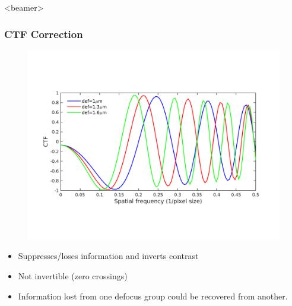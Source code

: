 \documentclass{beamer}
\begin{document}
\begin{frame}<beamer>
\frametitle{CTF Correction}
\vspace{-3mm}
\begin{figure}[]
\includegraphics[scale=0.45]{figures/ctfeg_fig.png}
\end{figure}
\vspace{-12mm}
\begin{itemize}[]
\item Suppresses/loses information and inverts contrast
\item Not invertible (zero crossings)
\item Information lost from one defocus group could be recovered from another.
\end{itemize}
\end{frame}
\end{document}
